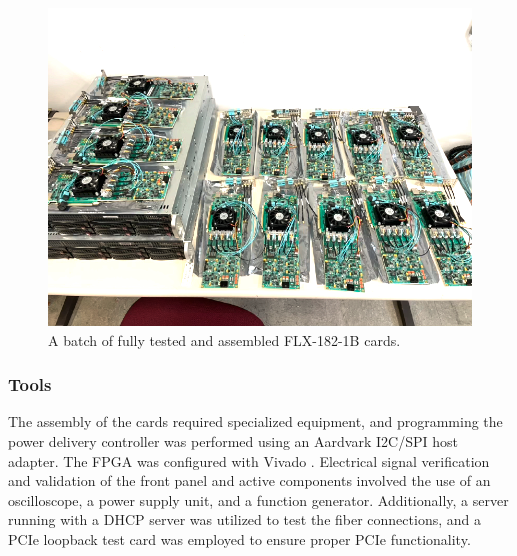 \begin{figure}[H]
\centering
\includegraphics[width=\textwidth]{images/contributions/felix-cards.png}
\caption{A batch of fully tested and assembled FLX-182-1B cards.}
\label{fig:batch-felix-cards}
\end{figure}

\subsubsection{Tools}

The assembly of the cards required specialized equipment, and programming the power delivery controller was performed using an Aardvark I2C/SPI host adapter. The \acs{FPGA} was configured with Vivado \cite{vivado}. Electrical signal verification and validation of the front panel and active components involved the use of an oscilloscope, a power supply unit, and a function generator. Additionally, a server running with a \acs{DHCP} server was utilized to test the fiber connections, and a \acs{PCIe} loopback test card was employed to ensure proper \acs{PCIe} functionality.

